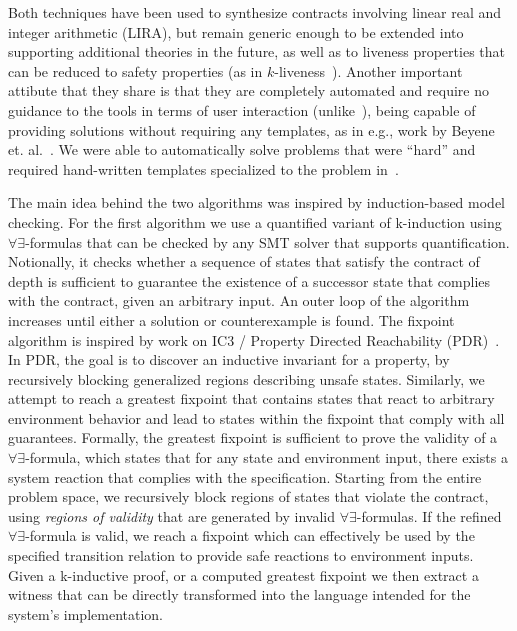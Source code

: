 Both techniques have been used to synthesize contracts involving linear real and integer arithmetic (LIRA), but remain generic enough to be extended into supporting additional theories in the future, as well as to liveness properties that can be reduced to safety properties (as in $k$-liveness~\cite{claessen2012liveness}).  Another important attibute that they share is that they are completely automated and require no guidance to the tools in terms of user interaction (unlike~\cite{ryzhyk2014user,ryzhyk2016developing}), being capable of providing solutions without requiring any templates, as in e.g., work by Beyene et. al.~\cite{beyene2014constraint}.  We were able to automatically solve problems that were ``hard'' and required hand-written templates specialized to the problem in~\cite{beyene2014constraint}.

The main idea behind the two algorithms was inspired by induction-based model checking. For the first algorithm we use a quantified variant of k-induction using $\forall\exists$-formulas that can be checked by any SMT solver that supports quantification. Notionally, it checks whether a sequence of states that satisfy the contract of depth is sufficient to guarantee the existence of a successor state that complies with the contract, given an arbitrary input. An outer loop of the algorithm increases until either a solution or counterexample is found. The fixpoint algorithm is inspired by work on IC3 / Property Directed Reachability (PDR)~\cite{bradley2011sat,een2011efficient}. In PDR, the goal is to discover an inductive invariant for a property, by recursively blocking generalized regions describing unsafe states. Similarly, we attempt to reach a greatest fixpoint that contains states that react to arbitrary environment behavior and lead to states within the fixpoint that comply with all guarantees. Formally, the greatest fixpoint is sufficient to prove the validity of a $\forall\exists$-formula, which states that for any state and environment input, there exists a system reaction that complies with the specification. Starting from the entire problem space, we recursively block regions of states that violate the contract, using \textit{regions of validity} that are generated by invalid $\forall\exists$-formulas. If the refined $\forall\exists$-formula is valid, we reach a fixpoint which can effectively be used by the specified transition relation to provide safe reactions to environment inputs. Given a k-inductive proof, or a computed greatest fixpoint we then extract a witness that can be directly transformed into the language intended for the system's implementation.

